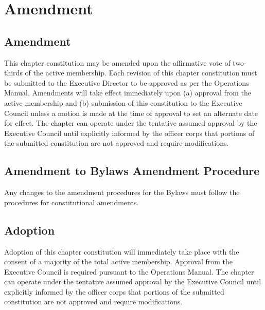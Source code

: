 \chapter{Amendment}
\section{Amendment}
This chapter constitution may be amended upon the affirmative vote of two-thirds of the active membership. Each revision of this chapter constitution must be submitted to the \hkn Executive Director to be approved as per the \hkn Operations Manual. Amendments will take effect immediately upon (a) approval from the active membership and (b) submission of this constitution to the \hkn Executive Council unless a motion is made at the time of approval to set an alternate date for effect. The chapter can operate under the tentative assumed approval by the \hkn Executive Council until explicitly informed by the officer corps that portions of the submitted constitution are not approved and require modifications.

\section{Amendment to Bylaws Amendment Procedure}
Any changes to the amendment procedures for the Bylaws must follow the procedures for constitutional amendments.

\section{Adoption}
Adoption of this chapter constitution will immediately take place with the consent of a majority of the total active membership. Approval from the \hkn Executive Council is required pursuant to the \hkn Operations Manual. The chapter can operate under the tentative assumed approval by the \hkn Executive Council until explicitly informed by the officer corps that portions of the submitted constitution are not approved and require modifications.




